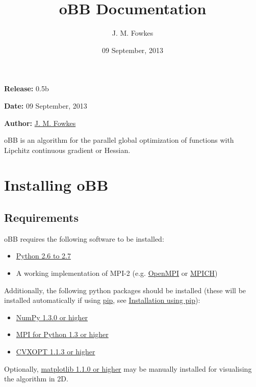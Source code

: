 \documentclass[letterpaper,11pt,openany,oneside]{sphinxmanual}
\title{oBB Documentation}
\date{09 September, 2013}
\author{J. M. Fowkes}
\begin{document}
\maketitle
\tableofcontents
{}\label{index::doc}


\textbf{Release:} 0.5b

\textbf{Date:} 09 September, 2013

\textbf{Author:} \href{mailto:jaroslav.fowkes@ed.ac.uk}{J. M. Fowkes}

oBB is an algorithm for the parallel global optimization of functions with Lipchitz continuous gradient or Hessian.


\chapter{Installing oBB}
\label{install:installing-obb}\label{install::doc}\label{install:overlapping-branch-and-bound}

\section{Requirements}
\label{install:requirements}
oBB requires the following software to be installed:
\begin{itemize}
\item {} 
\href{http://www.python.org/}{Python 2.6 to 2.7}

\item {} 
A working implementation of MPI-2 (e.g. \href{http://www.open-mpi.org/}{OpenMPI} or \href{http://www.mpich.org/}{MPICH})

\end{itemize}

Additionally, the following python packages should be installed (these will be installed automatically if using \href{http://www.pip-installer.org/}{pip}, see {\hyperref[install:installation-using-pip]{Installation using pip}}):
\begin{itemize}
\item {} 
\href{http://www.numpy.org/}{NumPy 1.3.0 or higher}

\item {} 
\href{http://mpi4py.scipy.org/}{MPI for Python 1.3 or higher}

\item {} 
\href{http://cvxopt.org/}{CVXOPT 1.1.3 or higher}

\end{itemize}

Optionally, \href{http://www.matplotlib.org/}{matplotlib 1.1.0 or higher} may be manually installed for visualising the algorithm in 2D.
\end{document}

